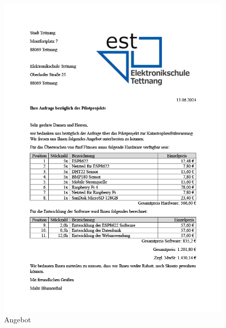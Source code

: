 \begin{figure}[h]
	\centering
	\includegraphics[width=14.5cm]{images/Angebot.png}
	\caption{Angebot}
	\label{fig:angebot}
\end{figure}


